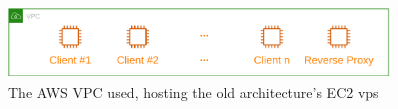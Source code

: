 \begin{figure}[!htbp]
    \centering
    \includegraphics[width=0.90\textwidth]{img/diagrams/pdf/old-arch-overview.drawio.pdf}
    \caption[AWS VPC Overview]{The AWS VPC used, hosting the old architecture's EC2 \gls{vps}}
    \label{fig:old-arch-overview}
\end{figure}
    